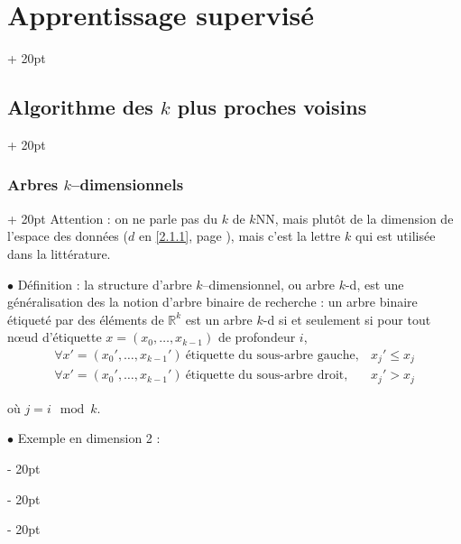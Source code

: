 \documentclass[a4paper, 12pt, twoside]{article}
\newcommand{\R}{\mathbb{R}} %
\renewcommand{\le}{\leqslant}
\newcommand{\ind}[1][20pt]{\advance\leftskip + #1}
\newcommand{\deind}[1][20pt]{\advance\leftskip - #1}
\newenvironment{indt}[2][20pt]{#2 \par \ind[#1]}{\par \deind} %
\begin{document}
\begin{indt}{\section{Apprentissage supervisé}}
\begin{indt}{\subsection{Algorithme des $k$ plus proches voisins}}
            \vspace{12pt}
            
            \begin{indt}{\subsubsection{Arbres $k$--dimensionnels}}
                Attention : on ne parle pas du $k$ de $k$NN, mais plutôt de la dimension de l'espace des données ($d$ en \ref{2.1.1}, page \pageref{2.1.1}), mais c'est la lettre $k$ qui est utilisée dans la littérature.

                \vspace{12pt}
                
                $\bullet$ Définition : la structure d'arbre $k$--dimensionnel, ou arbre $k$-d, est une généralisation des la notion d'arbre binaire de recherche : un arbre binaire étiqueté par des éléments de $\R^k$ est un arbre $k$-d si et seulement si pour tout n\oe ud d'étiquette $x = (x_0, \ldots, x_{k - 1})$ de profondeur $i$,
                \[
                    \begin{array}{ll}
                        \forall x' = (x_0', \ldots, x_{k - 1}')\ \text{étiquette du sous-arbre gauche}, & x_j' \le x_j
                        \\
                        \forall x' = (x_0', \ldots, x_{k - 1}')\ \text{étiquette du sous-arbre droit}, & x_j' > x_j
                    \end{array}
                \]

                où $j = i \mod k$.

                \vspace{12pt}
                
                $\bullet$ Exemple en dimension 2 :

                \begin{center}
\end{center}
\end{indt}
\end{indt}
\end{indt}
\end{document}
